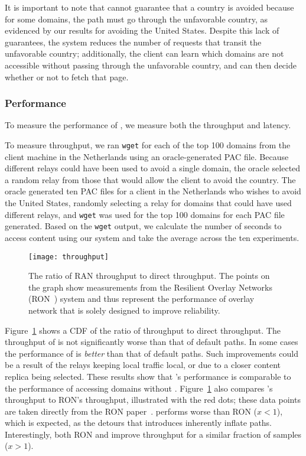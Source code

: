 It is important to note that \system{} cannot guarantee that a country is 
avoided because for some domains, the path must go through the unfavorable 
country, as evidenced by our results for avoiding the United States.  Despite 
this lack of guarantees, the system reduces the number of requests that 
transit the unfavorable country; additionally, the client can learn which domains 
are not accessible without passing through the unfavorable country, and can then 
decide whether or not to fetch that page.  

\subsubsection{Performance}
To measure the performance of \system{}, we measure both 
the throughput and latency.

To measure throughput, we ran {\tt wget} for each 
of the top 100 domains from the client machine in the Netherlands 
using an oracle-generated PAC file.  Because different relays could have been 
used to avoid a single domain, the oracle selected a random relay from those 
that would allow the client to avoid the country.  The oracle generated 
ten PAC files for a client in the Netherlands who wishes to avoid the United States,
 randomly selecting a relay for domains that could have used 
different relays, and {\tt wget} was used for the top 100 domains for each 
PAC file generated.  Based on the {\tt wget} output, we calculate the number 
of seconds to access content using our system and take the average across the 
ten experiments. 

\begin{figure}[t]
\centering
\texttt{[image: throughput]}
\caption{The ratio of RAN throughput to direct throughput.  
The points on the graph show measurements from the Resilient Overlay
Networks (RON~\cite{andersen2001resilient}) system and thus represent  the performance of overlay network
that is solely designed to improve reliability.} 
\label{fig:throughput}
\end{figure}

Figure~\ref{fig:throughput} shows a CDF of the ratio of \system{}
throughput to direct throughput.  The throughput of
\system{} is not significantly worse than that of default paths.  
In some cases the performance of \system{} is {\it better} than
that of default paths.  Such improvements could be a result of the
relays keeping local traffic local, or due to a closer content replica
being selected.  These results show that \system{}'s performance is
comparable to the performance of accessing domains without \system{}.
Figure~\ref{fig:throughput} also compares \system{}'s throughput to
RON's throughput, illustrated with the red dots; these data points are taken 
directly from the RON paper~\cite{andersen2001resilient}.  \system{} performs
worse than RON ($x < 1$), which is expected, as the detours that
\system{} introduces inherently inflate paths.  Interestingly, both
RON and \system{} improve throughput for a similar fraction of samples
($x>1$).

